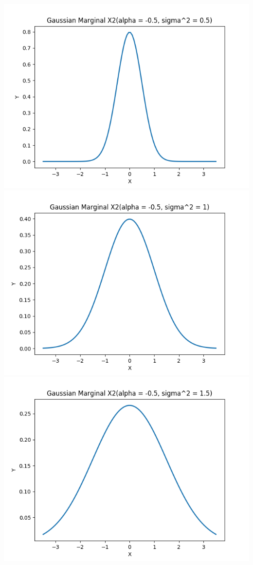 \documentclass{article}
\begin{document}
\includegraphics[width=\linewidth]{X2(alpha = -0.5, sigma^2 = 0.5).png}
\includegraphics[width=\linewidth]{X2(alpha = -0.5, sigma^2 = 1).png}
\includegraphics[width=\linewidth]{X2(alpha = -0.5, sigma^2 = 1.5).png}
\end{document}
